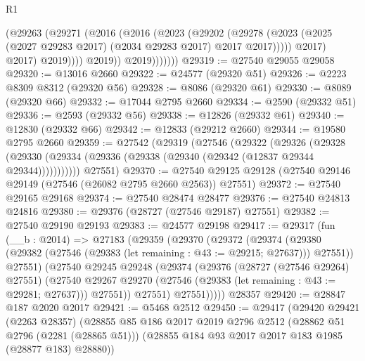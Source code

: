 \begin{lexlean}{R1}
\begin{coremodule}
                          (@29263
                            (@29271
                              (@2016
                                (@2016
                                  (@2023
                                    (@29202
                                      (@29278
                                        (@2023
                                          (@2025
                                            (@2027 @29283 @2017)
                                            (@2034 @29283 @2017)
                                            @2017
                                            @2017)))))
                                  @2017)
                                @2017)
                              @2019))))
                      @2019))
                  @2019)))))))
@29319 := @27540 @29055 @29058
@29320 := @13016 @2660
@29322 := @24577 (@29320 @51)
@29326 := @2223 @8309 @8312 (@29320 @56)
@29328 := @8086 (@29320 @61)
@29330 := @8089 (@29320 @66)
@29332 := @17044 @2795 @2660
@29334 := @2590 (@29332 @51)
@29336 := @2593 (@29332 @56)
@29338 := @12826 (@29332 @61)
@29340 := @12830 (@29332 @66)
@29342 := @12833 (@29212 @2660)
@29344 := @19580 @2795 @2660
@29359 := @27542
    (@29319
      (@27546
        (@29322
          (@29326
            (@29328 (@29330 (@29334 (@29336 (@29338 (@29340 (@29342 (@12837 @29344 @29344)))))))))))
      @27551)
@29370 := @27540 @29125 @29128 (@27540 @29146 @29149 (@27546 (@26082 @2795 @2660 @2563)) @27551)
@29372 := @27540 @29165 @29168
@29374 := @27540 @28474 @28477
@29376 := @27540 @24813 @24816
@29380 := @29376 (@28727 (@27546 @29187) @27551)
@29382 := @27540 @29190 @29193
@29383 := @24577 @29198
@29417 := @29317
    (fun (__b : @2014) =>
    @27183
      (@29359
        (@29370
          (@29372
            (@29374
              (@29380 (@29382 (@27546 (@29383 (let remaining : @43 := @29215; @27637))) @27551))
              @27551)
            (@27540
              @29245
              @29248
              (@29374
                (@29376
                  (@28727 (@27546 @29264) @27551)
                  (@27540
                    @29267
                    @29270
                    (@27546 (@29383 (let remaining : @43 := @29281; @27637)))
                    @27551))
                @27551)
              @27551)))))
    @28357
@29420 := @28847 @187 @2020 @2017
@29421 := @5468 @2512
@29450 := @29417
    (@29420
      @29421
      (@2263 @28357)
      (@28855
        @85
        @186
        @2017
        @2019
        @2796
        @2512
        (@28862 @51 @2796 (@2281 (@28865 @51)))
        (@28855 @184 @93 @2017 @2017 @183 @1985 (@28877 @183) @28880))

\end{coremodule}
\end{lexlean}
